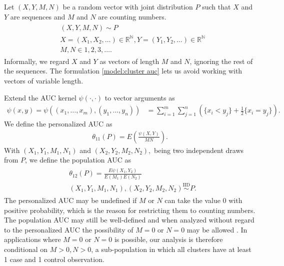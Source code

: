 \documentclass[12pt]{article}
\DeclareMathOperator{\AUC}{AUC}
\newcommand{\E}{E}
\renewcommand{\P}{P}
\newcommand{\cind}{\perp \!\!\! \perp}
\newcommand{\aucindiv}{\theta_{11}}%
\newcommand{\aucpop}{\theta_{12}}%
\newcommand{\kernel}{\psi}
\begin{document}
Let $(X,Y,M,N)$ be a random vector
with joint distribution $\P$  such that $X$ and $Y$ are sequences and $M$ and $N$ are counting numbers.%
\begin{gather}
\begin{aligned}\label{model:cluster auc}
  &(X,Y,M,N) \sim \P\\
  &X=(X_1,X_2,\ldots)\in\mathbb{R}^\mathbb{N}, Y=(Y_1,Y_2,\ldots)\in\mathbb{R}^\mathbb{N}\\
  &M,N \in 1,2,3,\ldots .
\end{aligned}
\end{gather}
Informally, we regard $X$ and $Y$ as vectors of length $M$ and $N$, ignoring the rest of the sequences. The formulation \eqref{model:cluster auc} lets us avoid working with vectors of variable length.

Extend the AUC kernel $\psi(\cdot,\cdot)$ to vector arguments as
\begin{align}
  \kernel(x,y)=\kernel((x_1,\ldots,x_m),(y_1,\ldots,y_n))&=\sum_{i=1}^m\sum_{j=1}^n\left(\{x_i<y_j\}+\frac{1}{2}\{x_i=y_j\}\right).\label{defn:auc kernel}
\end{align}
We define the personalized AUC as
\begin{align}
  \aucindiv(\P)=\E\left(\frac{\psi(X,Y)}{MN} \right).
  \label{defn:aucindiv}
\end{align}
With $(X_1,Y_1,M_1,N_1)$ and $(X_2,Y_2,M_2,N_2),$ being two independent draws from $P$, we define the population AUC as
\begin{gather}
  \begin{aligned}
  &\aucpop(\P)=\frac{\E\psi(X_1,Y_2)}{\E(M_1)\E(N_2)}\label{defn:aucpop}\\
  &(X_1,Y_1,M_1,N_1),(X_2,Y_2,M_2,N_2) \overset{\text{IID}}{\sim} \P.
\end{aligned}
\end{gather}
The personalized AUC may be undefined if $M$ or $N$ can take the value
$0$ with positive probability, which is the reason for restricting
them to counting numbers. The population AUC may still be well-defined
and when analyzed without regard to the personalized AUC the possibility
of $M=0$ or $N=0$ may be allowed \citep{obuchowski1997}. In
applications where $M=0$ or $N=0$ is possible, our analysis is
therefore conditional on $M>0,N>0$, a sub-population in which all
clusters have at least 1 case and 1 control observation.
\end{document}
